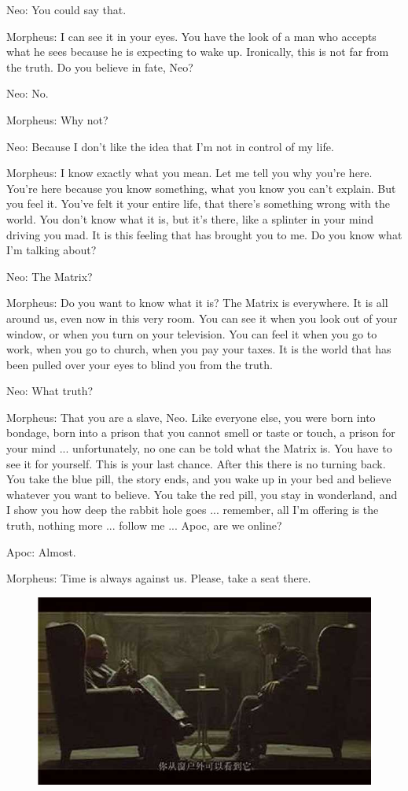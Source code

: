 \documentclass{ctexart}
\newenvironment{myquote}{\color{green} \setlength{\leftskip}{6em} \setlength{\rightskip}{4em} \setlength{\parindent}{-2em}}{\par}
\begin{document}
\begin{myquote}
Neo: You could say that.

Morpheus: I can see it in your eyes. You have the look of a man who accepts what he sees because he is expecting to wake up. Ironically, this is not far from the truth. Do you believe in fate, Neo?

Neo: No.

Morpheus: Why not?

Neo: Because I don't like the idea that I'm not in control of my life.

Morpheus: I know exactly what you mean. Let me tell you why you're here. You're here because you know something, what you know you can't explain. But you feel it. You've felt it your entire life, that there's something wrong with the world. You don't know what it is, but it's there, like a splinter in your mind driving you mad. It is this feeling that has brought you to me. Do you know what I'm talking about?

Neo: The Matrix?

Morpheus: Do you want to know what it is? The Matrix is everywhere. It is all around us, even now in this very room. You can see it when you look out of your window, or when you turn on your television. You can feel it when you go to work, when you go to church, when you pay your taxes. It is the world that has been pulled over your eyes to blind you from the truth.

Neo: What truth?

Morpheus: That you are a slave, Neo. Like everyone else, you were born into bondage, born into a prison that you cannot smell or taste or touch, a prison for your mind ... unfortunately, no one can be told what the Matrix is. You have to see it for yourself. This is your last chance. After this there is no turning back. You take the blue pill, the story ends, and you wake up in your bed and believe whatever you want to believe. You take the red pill, you stay in wonderland, and I show you how deep the rabbit hole goes ... remember, all I'm offering is the truth, nothing more ... follow me ... Apoc, are we online?

Apoc: Almost.

Morpheus: Time is always against us. Please, take a seat there.
\end{myquote}

\begin{figure}[htb]
\centering
\includegraphics[width=0.5\linewidth]{fig/read_Matrix-18}
\end{figure}
\end{document}
